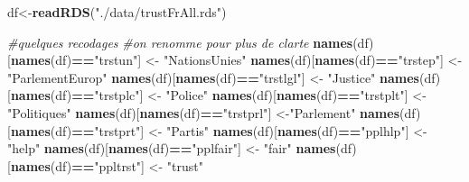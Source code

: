 \documentclass[
]{book}
\newenvironment{Shaded}{\begin{snugshade}}{\end{snugshade}}
\newcommand{\CommentTok}[1]{\textcolor[rgb]{0.56,0.35,0.01}{\textit{#1}}}
\newcommand{\KeywordTok}[1]{\textcolor[rgb]{0.13,0.29,0.53}{\textbf{#1}}}
\newcommand{\NormalTok}[1]{#1}
\newcommand{\OperatorTok}[1]{\textcolor[rgb]{0.81,0.36,0.00}{\textbf{#1}}}
\newcommand{\StringTok}[1]{\textcolor[rgb]{0.31,0.60,0.02}{#1}}
\begin{document}
\begin{Shaded}
\begin{Highlighting}[]
\NormalTok{df<-}\KeywordTok{readRDS}\NormalTok{(}\StringTok{"./data/trustFrAll.rds"}\NormalTok{)}

\CommentTok{#quelques recodages}
\CommentTok{#on renomme pour plus de clarte}
\KeywordTok{names}\NormalTok{(df)[}\KeywordTok{names}\NormalTok{(df)}\OperatorTok{==}\StringTok{"trstun"}\NormalTok{] <-}\StringTok{ "NationsUnies"} 
\KeywordTok{names}\NormalTok{(df)[}\KeywordTok{names}\NormalTok{(df)}\OperatorTok{==}\StringTok{"trstep"}\NormalTok{] <-}\StringTok{ "ParlementEurop"} 
\KeywordTok{names}\NormalTok{(df)[}\KeywordTok{names}\NormalTok{(df)}\OperatorTok{==}\StringTok{"trstlgl"}\NormalTok{] <-}\StringTok{ "Justice"} 
\KeywordTok{names}\NormalTok{(df)[}\KeywordTok{names}\NormalTok{(df)}\OperatorTok{==}\StringTok{"trstplc"}\NormalTok{] <-}\StringTok{ "Police"} 
\KeywordTok{names}\NormalTok{(df)[}\KeywordTok{names}\NormalTok{(df)}\OperatorTok{==}\StringTok{"trstplt"}\NormalTok{] <-}\StringTok{ "Politiques"} 
\KeywordTok{names}\NormalTok{(df)[}\KeywordTok{names}\NormalTok{(df)}\OperatorTok{==}\StringTok{"trstprl"}\NormalTok{] <-}\StringTok{"Parlement"} 
\KeywordTok{names}\NormalTok{(df)[}\KeywordTok{names}\NormalTok{(df)}\OperatorTok{==}\StringTok{"trstprt"}\NormalTok{] <-}\StringTok{ "Partis"}
\KeywordTok{names}\NormalTok{(df)[}\KeywordTok{names}\NormalTok{(df)}\OperatorTok{==}\StringTok{"pplhlp"}\NormalTok{] <-}\StringTok{ "help"}
\KeywordTok{names}\NormalTok{(df)[}\KeywordTok{names}\NormalTok{(df)}\OperatorTok{==}\StringTok{"pplfair"}\NormalTok{] <-}\StringTok{ "fair"}
\KeywordTok{names}\NormalTok{(df)[}\KeywordTok{names}\NormalTok{(df)}\OperatorTok{==}\StringTok{"ppltrst"}\NormalTok{] <-}\StringTok{ "trust"}


\end{Highlighting}
\end{Shaded}
\end{document}
